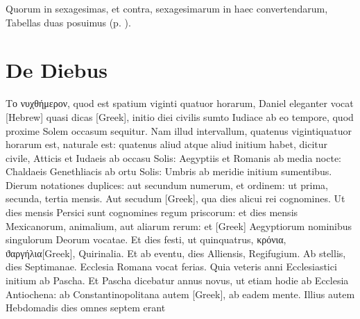 Quorum in sexagesimas, et
contra, sexagesimarum in haec convertendarum, Tabellas duas posuimus
 (p. \pageref{tab:p006}).
\begin{table}
  
\end{table}

\section{De Diebus}

\textgreek{Το νυχθήμερον},
quod est spatium viginti quatuor horarum, Daniel
eleganter vocat \texthebrew{[Hebrew]} quasi dicas
 \textgreek{[Greek]}, initio diei civilis
sumto Iudiace ab eo tempore, quod proxime Solem occasum
sequitur.
Nam illud intervallum, quatenus vigintiquatuor horarum est,
naturale est: quatenus aliud atque aliud initium habet, dicitur civile,
Atticis et Iudaeis ab occasu Solis: Aegyptiis et Romanis ab media nocte:
Chaldaeis Genethliacis ab ortu Solis: Umbris ab meridie initium
sumentibus.
Dierum notationes duplices: aut secundum numerum, et
ordinem: ut prima, secunda, tertia mensis.
Aut secudum \textgreek{[Greek]},
qua dies alicui rei cognomines.
Ut dies mensis Persici sunt cognomines
regum priscorum: et dies mensis Mexicanorum, animalium, aut aliarum
rerum: et \textgreek{[Greek]} Aegyptiorum nominibus singulorum Deorum
vocatae.
Et dies festi, ut quinquatrus, \textgreek{κρόνια},
\textgreek{ϑαργήλια[Greek]}, Quirinalia.
Et ab eventu, dies Alliensis, Regifugium.
Ab stellis, dies Septimanae.
Ecclesia Romana vocat ferias.
Quia veteris anni Ecclesiastici initium
ab Pascha.
Et Pascha dicebatur annus novus, ut etiam hodie ab Ecclesia
Antiochena: ab Constantinopolitana autem \textgreek{[Greek]},
ab eadem mente.
Illius autem Hebdomadis dies omnes septem erant
